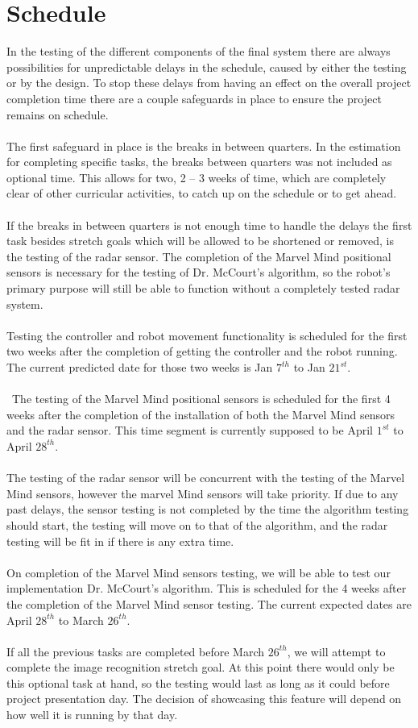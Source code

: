\documentclass[english,12pt]{article}
\begin{document}
\section{Schedule}
In the testing of the different components of the final system there are always possibilities 
for unpredictable delays in the schedule, caused by either the testing or by the design. 
To stop these delays from having an effect on the overall project completion time there are a 
couple safeguards in place to ensure the project remains on schedule.\\\\
The first safeguard in place is the breaks in between quarters. In the estimation for 
completing specific tasks, the breaks between quarters was not included as optional time. 
This allows for two, 2 – 3 weeks of time, which are completely clear of other curricular 
activities, to catch up on the schedule or to get ahead.\\\\
If the breaks in between quarters is not enough time to handle the delays the first task 
besides stretch goals which will be allowed to be shortened or removed, is the testing of 
the radar sensor. The completion of the Marvel Mind positional sensors is necessary for the 
testing of Dr. McCourt’s algorithm, so the robot’s primary purpose will still be able to 
function without a completely tested radar system.\\\\
Testing the controller and robot movement functionality is scheduled for the first two weeks 
after the completion of getting the controller and the robot running. The current predicted date 
for those two weeks is Jan $7^{th}$ to Jan $21^{st}$.\\\\\
The testing of the Marvel Mind positional sensors is scheduled for the first 4 weeks after the 
completion of the installation of both the Marvel Mind sensors and the radar sensor. This time 
segment is currently supposed to be April $1^{st}$ to April $28^{th}$.\\\\
The testing of the radar sensor will be concurrent with the testing of the Marvel Mind sensors, 
however the marvel Mind sensors will take priority. If due to any past delays, the sensor testing 
is not completed by the time the algorithm testing should start, the testing will move on to that 
of the algorithm, and the radar testing will be fit in if there is any extra time.\\\\
On completion of the Marvel Mind sensors testing, we will be able to test our implementation 
Dr. McCourt’s algorithm. This is scheduled for the 4 weeks after the completion of the Marvel 
Mind sensor testing. The current expected dates are April $28^{th}$ to March $26^{th}$.\\\\
If all the previous tasks are completed before March $26^{th}$, we will attempt to complete the image 
recognition stretch goal. At this point there would only be this optional task at hand, so the 
testing would last as long as it could before project presentation day. The decision of showcasing 
this feature will depend on how well it is running by that day.
\end{document}
